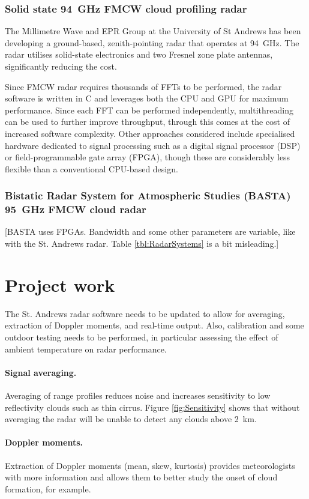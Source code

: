 \documentclass{article}
\begin{document}
\subsubsection{Solid state \SI{94}{\giga\hertz} FMCW cloud profiling radar}
The Millimetre Wave and EPR Group at the University of St Andrews has been developing a ground-based, zenith-pointing radar that operates at \SI{94}{\giga\hertz}.\supercite{StAndrewsRadar} The radar utilises solid-state electronics and two Fresnel zone plate antennas, significantly reducing the cost.

Since FMCW radar requires thousands of FFTs to be performed, the radar software is written in C and leverages both the CPU and GPU for maximum performance. Since each FFT can be performed independently, multithreading can be used to further improve throughput, through this comes at the cost of increased software complexity.\supercite{Cassidy}
Other approaches considered include specialised hardware dedicated to signal processing such as a digital signal processor (DSP) or field-programmable gate array (FPGA), though these are considerably less flexible than a conventional CPU-based design.

\subsubsection{Bistatic Radar System for Atmospheric Studies (BASTA) \SI{95}{\giga\hertz} FMCW cloud radar}
[BASTA uses FPGAs. Bandwidth and some other parameters are variable, like with the St. Andrews radar. Table \ref{tbl:RadarSystems} is a bit misleading.]

\section{Project work}
The St. Andrews radar software needs to be updated to allow for averaging, extraction of Doppler moments, and real-time output. Also, calibration and some outdoor testing needs to be performed, in particular assessing the effect of ambient temperature on radar performance. 
\paragraph{Signal averaging.} Averaging of range profiles reduces noise and increases sensitivity to low reflectivity clouds such as thin cirrus. Figure \ref{fig:Sensitivity} shows that without averaging the radar will be unable to detect any clouds above \SI{2}{\kilo\metre}.
\paragraph{Doppler moments.} Extraction of Doppler moments (mean, skew, kurtosis) provides meteorologists with more information and allows them to better study the onset of cloud formation, for example.
\end{document}
